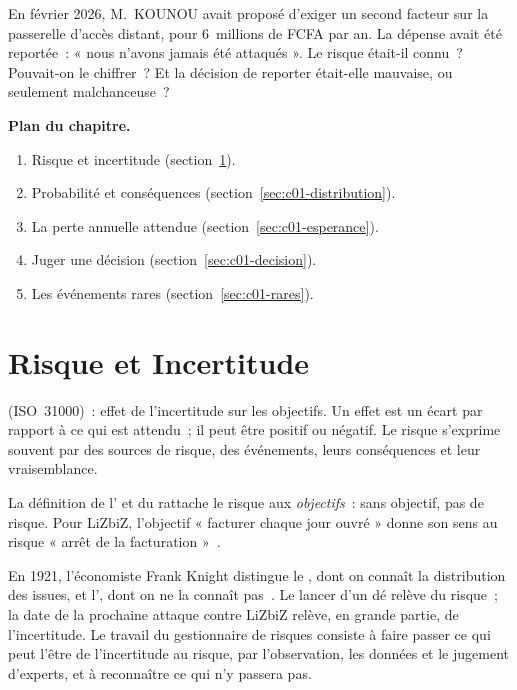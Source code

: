 En février 2026, M.~KOUNOU avait proposé d'exiger un second facteur sur la
passerelle d'accès distant, pour 6~millions de FCFA par an. La dépense
avait été reportée~: « nous n'avons jamais été attaqués ». Le risque
était-il connu~? Pouvait-on le chiffrer~? Et la décision de reporter
était-elle mauvaise, ou seulement malchanceuse~?

\medskip
\textbf{Plan du chapitre.}
\begin{enumerate}
    \item Risque et incertitude (section~\ref{sec:c01-definir}).
    \item Probabilité et conséquences (section~\ref{sec:c01-distribution}).
    \item La perte annuelle attendue (section~\ref{sec:c01-esperance}).
    \item Juger une décision (section~\ref{sec:c01-decision}).
    \item Les événements rares (section~\ref{sec:c01-rares}).
\end{enumerate}

\separateur

\section{Risque et Incertitude}
\label{sec:c01-definir}

\begin{boxdef}
 (ISO~31000)~: effet de l'incertitude sur les objectifs.
Un effet est un écart par rapport à ce qui est attendu~; il peut être
positif ou négatif. Le risque s'exprime souvent par des sources de risque,
des événements, leurs conséquences et leur vraisemblance.
\end{boxdef}

La définition de l' et du  rattache
le risque aux \emph{objectifs}~: sans objectif, pas de risque. Pour
LiZbiZ, l'objectif « facturer chaque jour ouvré » donne son sens au risque
« arrêt de la facturation »~\cite{iso31000_2018,isoguide73}.

En 1921, l'économiste Frank Knight distingue le , dont on
connaît la distribution des issues, et l', dont on ne
la connaît pas~\cite{knight1921}. Le lancer d'un dé relève du risque~; la
date de la prochaine attaque contre LiZbiZ relève, en grande partie, de
l'incertitude. Le travail du gestionnaire de risques consiste à faire
passer ce qui peut l'être de l'incertitude au risque, par l'observation,
les données et le jugement d'experts, et à reconnaître ce qui n'y passera
pas.


